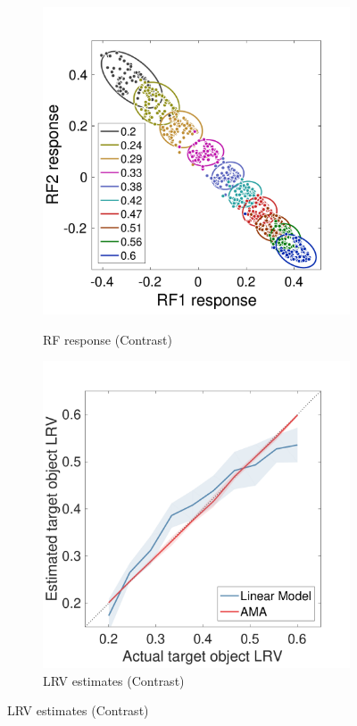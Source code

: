 \documentclass{jov}
\begin{document}
\begin{figure}
\begin{subfigure}[b]{0.22 \textwidth}
        \label{fig:IsomerizationResults}
    \end{subfigure}
            \begin{subfigure}[b]{0.22 \textwidth}
        \caption{RF response (Contrast)}
        \includegraphics[width=\textwidth]{../FiguresDraft4/Figure11/Figure11_c.pdf}
        \label{fig:contrastWorks}
    \end{subfigure}
            \begin{subfigure}[b]{0.22 \textwidth}
        \caption{LRV estimates (Contrast)}
        \includegraphics[width=\textwidth]{../FiguresDraft4/Figure11/Figure11_d.pdf}

\end{subfigure}
\end{figure}
\end{document}
